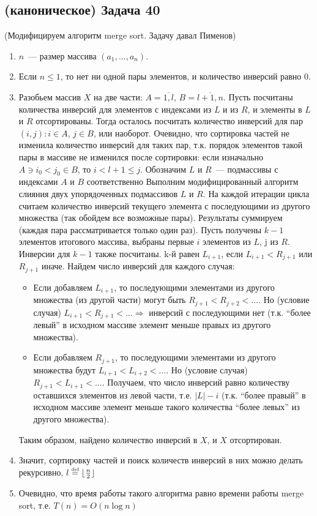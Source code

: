 \documentclass[a4paper]{article}
\def\eqdef{\overset{\mbox{\tiny def}}{=}}
\begin{document}
\subsection*{(каноническое) Задача 40}
(Модифицируем алгоритм merge sort. Задачу давал Пименов)
\begin{enumerate}
\item $n$~--- размер массива $(a_1,...,a_n)$.
\item Если $n\leqslant 1$, то нет ни одной пары элементов, и количество инверсий равно $0$.
\item Разобьем массив $X$ на две части: $A=\overline{1,l},\,B=\overline{l+1,n}$. Пусть посчитаны количества инверсий для элементов с индексами из $L$ и из $R$, и элементы в $L$ и $R$ отсортированы.
Тогда осталось посчитать количество инверсий для пар $(i,j)\colon i\in A,\, j\in B$, или наоборот. Очевидно, что сортировка частей не изменила количество инверсий для таких пар, т.к. порядок элементов такой пары в массиве не изменился после сортировки: если изначально $A\ni i_0<j_0\in B$, то $i< l+1\leqslant j$. Обозначим $L$ и $R$~--- подмассивы с индексами $A$ и $B$ соответственно\newline
Выполним модифицированный алгоритм слияния двух упорядоченных подмассивов $L$ и $R$. На каждой итерации цикла считаем количество инверсий текущего элемента с последующими из другого множества (так обойдем все возможные пары). Результаты суммируем (каждая пара рассматривается только один раз).\newline
Пусть получены $k - 1$ элементов итогового массива, выбраны первые $i$ элементов из $L$, j из $R$. Инверсии для $k - 1$ также посчитаны.\newline
k-й равен $L_{i + 1}$, если $L_{i + 1} < R_{j + 1}$ или $R_{j +1}$ иначе.\newline
Найдем число инверсий для каждого случая:
\begin{itemize}
\item Если добавляем $L_{i + 1}$, то последующими элементами из другого множества (из другой части) могут быть $R_{j + 1} < R_{j + 2} < \ldots$. Но (условие случая) $L_{i + 1} < R_{j + 1} < \ldots \Rightarrow$ инверсий с последующими нет (т.к. ``более левый'' в исходном массиве элемент меньше правых из другого множества).

\item Если добавляем $R_{j + 1}$, то последующими элементами из другого множества будут $L_{i + 1} < L_{i + 2} < \ldots$. Но (условие случая) $R_{j + 1} < L_{i + 1} < \ldots$. Получаем, что число инверсий равно количеству оставшихся элементов из левой части, т.е. $|L| - i$ (т.к. ``более правый'' в исходном массиве элемент меньше такого количества ``более левых'' из другого множества).
\end{itemize}
Таким образом, найдено количество инверсий в $X$, и $X$ отсортирован.
\item Значит, сортировку частей и поиск количеств инверсий в них можно делать рекурсивно, $l\eqdef \lfloor \frac{n}{2}\rfloor$
\item Очевидно, что время работы такого алгоритма равно времени работы merge sort, т.е. $T(n)=O \left( n \log n \right)$
\end{enumerate}
\end{document}

